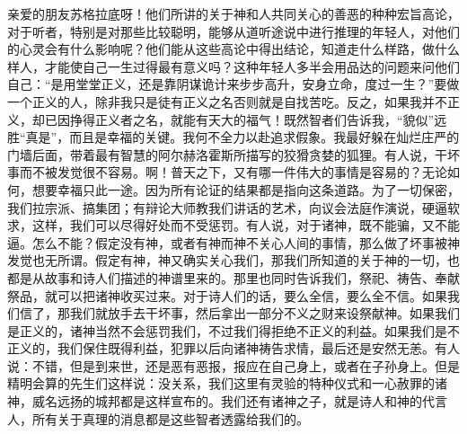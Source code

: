 \documentclass[12pt,oneside]{book}
\begin{document}
亲爱的朋友苏格拉底呀！他们所讲的关于神和人共同关心的善恶的种种宏旨高论，对于听者，特别是对那些比较聪明，能够从道听途说中进行推理的年轻人，对他们的心灵会有什么影响呢？他们能从这些高论中得出结论，知道走什么样路，做什么样人，才能使自己一生过得最有意义吗？这种年轻人多半会用品达的问题来问他们自己：“是用堂堂正义，还是靠阴谋诡计来步步高升，安身立命，度过一生？”要做一个正义的人，除非我只是徒有正义之名否则就是自找苦吃。反之，如果我并不正义，却已因挣得正义者之名，就能有天大的福气！既然智者们告诉我，“貌似”远胜“真是”，而且是幸福的关键。我何不全力以赴追求假象。我最好躲在灿烂庄严的门墙后面，带着最有智慧的阿尔赫洛霍斯所描写的狡猾贪婪的狐狸。有人说，干坏事而不被发觉很不容易。啊！普天之下，又有哪一件伟大的事情是容易的？无论如何，想要幸福只此一途。因为所有论证的结果都是指向这条道路。为了一切保密，我们拉宗派、搞集团；有辩论大师教我们讲话的艺术，向议会法庭作演说，硬逼软求，这样，我们可以尽得好处而不受惩罚。有人说，对于诸神，既不能骗，又不能逼。怎么不能？假定没有神，或者有神而神不关心人间的事情，那么做了坏事被神发觉也无所谓。假定有神，神又确实关心我们，那我们所知道的关于神的一切，也都是从故事和诗人们描述的神谱里来的。那里也同时告诉我们，祭祀、祷告、奉献祭品，就可以把诸神收买过来。对于诗人们的话，要么全信，要么全不信。如果我们信了，那我们就放手去干坏事，然后拿出一部分不义之财来设祭献神。如果我们是正义的，诸神当然不会惩罚我们，不过我们得拒绝不正义的利益。如果我们是不正义的，我们保住既得利益，犯罪以后向诸神祷告求情，最后还是安然无恙。有人说：不错，但是到来世，还是恶有恶报，报应在自己身上，或者在子孙身上。但是精明会算的先生们这样说：没关系，我们这里有灵验的特种仪式和一心赦罪的诸神，威名远扬的城邦都是这样宣布的。我们还有诸神之子，就是诗人和神的代言人，所有关于真理的消息都是这些智者透露给我们的。
\end{document}
